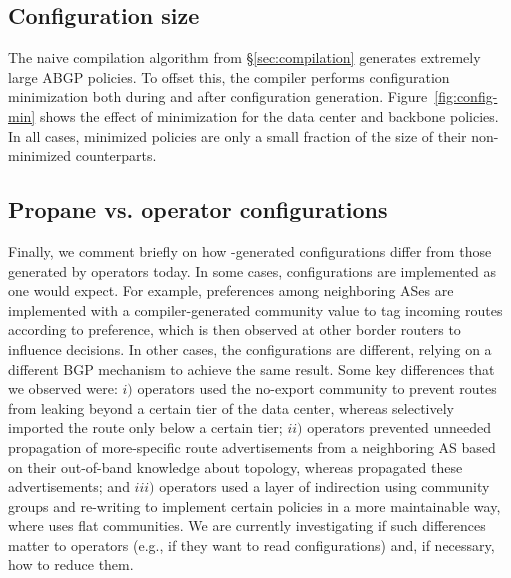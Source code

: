 \subsection{Configuration size}

The naive compilation algorithm from \S\ref{sec:compilation} generates extremely large ABGP policies. To offset this, the compiler performs configuration minimization both during and after configuration generation. 
Figure~\ref{fig:config-min} shows the effect of minimization for the data center and backbone policies. In all cases, minimized policies are only a small fraction of the size of their non-minimized counterparts.


\subsection{Propane vs. operator configurations}

Finally, we comment briefly on how \sysname-generated configurations differ from those generated by operators today. 
%
In some cases, \sysname configurations are implemented as one would expect. For example, preferences among neighboring ASes are implemented with a compiler-generated community value to tag incoming routes according to preference, which is then observed at other border routers to influence decisions. In other cases, the \sysname configurations are different, relying on a different BGP mechanism to achieve the same result. Some key differences that we observed were: 
%
$i)$ operators used the no-export community to prevent routes from leaking beyond a certain tier of the data center, whereas \sysname selectively imported the route only below a certain tier; 
%
$ii)$ operators prevented unneeded propagation of more-specific route advertisements from a neighboring AS based on their out-of-band knowledge about topology, whereas \sysname propagated these advertisements; and
%
$iii)$ operators used a layer of indirection using community groups and re-writing to implement certain policies in a more maintainable way, where \sysname uses flat communities. We are currently investigating if such differences matter to operators (e.g., if they want to read \sysname configurations) and, if necessary, how to reduce them.
